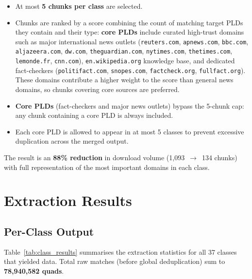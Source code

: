 \documentclass[11pt,a4paper]{article}
\begin{document}
\begin{itemize}[leftmargin=1.5em]
  \item At most \textbf{5 chunks per class} are selected.
\item Chunks are ranked by a score combining the count of matching target
      PLDs they contain and their type: \textbf{core PLDs} include curated
      high-trust domains such as major international news outlets (\texttt{reuters.com},
      \texttt{apnews.com}, \texttt{bbc.com}, \texttt{aljazeera.com},
      \texttt{dw.com}, \texttt{theguardian.com}, \texttt{nytimes.com},
      \texttt{thetimes.com}, \texttt{lemonde.fr}, \texttt{cnn.com}),  \texttt{en.wikipedia.org} knowledge base, and dedicated
      fact-checkers (\texttt{politifact.com}, \texttt{snopes.com},
      \texttt{factcheck.org}, \texttt{fullfact.org}). These
      domains contribute a higher weight to the score than general news
      domains, so chunks covering core sources are preferred.
  \item \textbf{Core PLDs} (fact-checkers and major news outlets) bypass the
        5-chunk cap: any chunk containing a core PLD is always included.
  \item Each core PLD is allowed to appear in at most 5 classes to prevent
        excessive duplication across the merged output.
\end{itemize}

The result is an \textbf{88\% reduction} in download volume (1{,}093~$\to$~134
chunks) with full representation of the most important domains in each class.


\section{Extraction Results}
\label{sec:results_extract}

\subsection{Per-Class Output}

Table~\ref{tab:class_results} summarises the extraction statistics for all 37
classes that yielded data.  Total raw matches (before global deduplication)
sum to \textbf{78{,}940{,}582 quads}.
\end{document}
